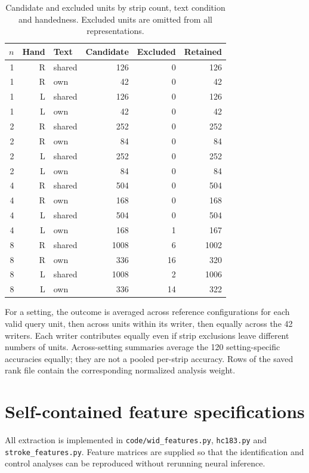 \documentclass[10pt,a4paper]{article}
\begin{document}
\begin{table}[ht]
\centering\small
\caption{Candidate and excluded units by strip count, text condition and handedness. Excluded units are omitted from all representations.}\label{tab:exclusions}
\begin{tabular}{rrlrrr}\toprule
$n$ & Hand & Text & Candidate & Excluded & Retained\\\midrule
1 & R & shared & 126 & 0 & 126 \\
1 & R & own & 42 & 0 & 42 \\
1 & L & shared & 126 & 0 & 126 \\
1 & L & own & 42 & 0 & 42 \\
2 & R & shared & 252 & 0 & 252 \\
2 & R & own & 84 & 0 & 84 \\
2 & L & shared & 252 & 0 & 252 \\
2 & L & own & 84 & 0 & 84 \\
4 & R & shared & 504 & 0 & 504 \\
4 & R & own & 168 & 0 & 168 \\
4 & L & shared & 504 & 0 & 504 \\
4 & L & own & 168 & 1 & 167 \\
8 & R & shared & 1008 & 6 & 1002 \\
8 & R & own & 336 & 16 & 320 \\
8 & L & shared & 1008 & 2 & 1006 \\
8 & L & own & 336 & 14 & 322 \\
\bottomrule

\end{tabular}
\end{table}

For a setting, the outcome is averaged across reference configurations for each valid query unit, then across units within its writer, then equally across the 42 writers. Each writer contributes equally even if strip exclusions leave different numbers of units. Across-setting summaries average the 120 setting-specific accuracies equally; they are not a pooled per-strip accuracy. Rows of the saved rank file contain the corresponding normalized analysis weight.

\section{Self-contained feature specifications}
All extraction is implemented in \texttt{code/wid\_features.py}, \texttt{hc183.py} and \texttt{stroke\_features.py}. Feature matrices are supplied so that the identification and control analyses can be reproduced without rerunning neural inference.
\end{document}
